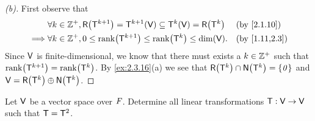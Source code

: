 \begin{proof}[(b)]
	First observe that
	\begin{align*}
		         & \forall k \in \Z^+, \rg{\T^{k + 1}} = \T^{k + 1}(\V) \subseteq \T^k(\V) = \rg{\T^k} &  & \by{2.1.10}   \\
		\implies & \forall k \in \Z^+, 0 \leq \rk{\T^{k + 1}} \leq \rk{\T^k} \leq \dim(\V).            &  & \by{1.11,2.3}
	\end{align*}
	Since \(\mathsf{V}\) is finite-dimensional, we know that there must exists a \(k \in \mathbb{Z}^+\) such that \(\rk{\T^{k + 1}} = \rk{\T^k}\).
	By \cref{ex:2.3.16}(a) we see that \(\rg{\T^k} \cap \ns{\T^k} = \set{\zv}\) and \(\V = \rg{\T^k} \oplus \ns{\T^k}\).
\end{proof}

\begin{ex}\label{ex:2.3.17}
	Let \(\mathsf{V}\) be a vector space over \(\mathit{F}\).
	Determine all linear transformations \(\mathsf{T} : \mathsf{V} \to \mathsf{V}\) such that \(\mathsf{T} = \mathsf{T}^2\).
\end{ex}

